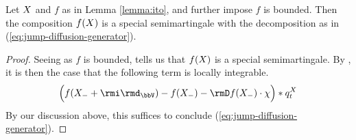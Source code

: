 \begin{proposition}
  \label{proposition:ito-bounded}
  Let $X$ and $f$ as in Lemma \ref{lemma:ito}, and further impose $f$ is bounded.
  Then the composition $f(X)$ is a special semimartingale with the decomposition as in (\ref{eq:jump-diffusion-generator}).
\end{proposition}
\begin{proof}
  \label{proof:proposition:ito-bounded}
  Seeing as $f$ is bounded, \cite[Lemma I.4.24]{jacod2003} tells us that $f(X)$ is a special semimartingale.
  By \cite[Proposition I.4.23]{jacod2003}, it is then the case that the following term is locally integrable.
  \[
    \Big( f(\X_-+\id_\vecSpace) - f(\X_-) - \Der f(\X_-) \cdot \trunc \Big) \ast \jumpMeas^\X_t
  \]
  By our discussion above, this suffices to conclude (\ref{eq:jump-diffusion-generator}).
\end{proof}
